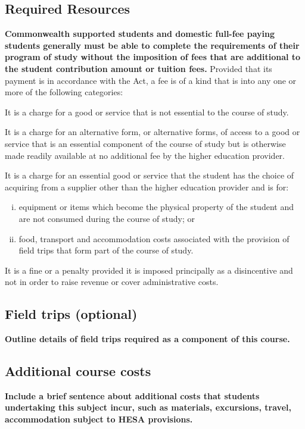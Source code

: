 \documentclass[11pt]{article}
\begin{document}
\subsection*{Required Resources}
{\bfseries\color{red}Commonwealth supported students and domestic full-fee paying students generally must be able to complete the requirements of their program of study without the imposition of fees that are additional to the student contribution amount or tuition fees.} \newline 
{\color{red}Provided that its payment is in accordance with the Act, a fee is of a kind that is into any one or more of the following categories:}

\begin{enumerate}[(a)]
	{\color{red}\item It is a charge for a good or service that is not essential to the course of study.
	\item It is a charge for an alternative form, or alternative forms, of access to a good or service that is an essential component of the course of study but is otherwise made readily available at no additional fee by the higher education provider.
	\item It is a charge for an essential good or service that the student has the choice of acquiring from a supplier other than the higher education provider and is for:
	\begin{enumerate}[(i)]
		\item  equipment or items which become the physical property of the student and are not consumed during the course of study; or
		\item	food, transport and accommodation costs associated with the provision of field trips that form part of the course of study.	
	\end{enumerate}
	\item	It is a fine or a penalty provided it is imposed principally as a disincentive and not in order to raise revenue or cover administrative costs.}
\end{enumerate}

\subsection*{Field trips (optional)}
{\bfseries\color{red}Outline details of field trips required as a component of this course.}

\subsection*{Additional course costs}
{\bfseries\color{red}Include a brief sentence about additional costs that students undertaking this subject incur, such as materials, excursions, travel, accommodation subject to HESA provisions.}
\end{document}

